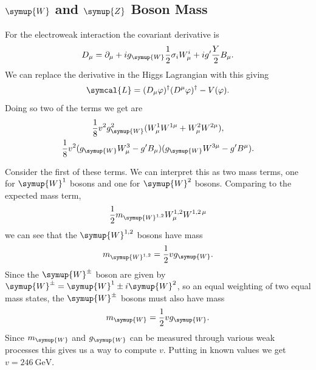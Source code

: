 \documentclass[fleqn]{NotesClass}
\newcommand{\Pparticle}[1]{\symup{#1}}
\newcommand{\PZ}{\ensuremath{\Pparticle{Z}}}
\newcommand{\PW}{\ensuremath{\Pparticle{W}}}
\newcommand{\PWpm}{\ensuremath{\Pparticle{W}^{\pm}}}
\newcommand{\hermit}{\dagger}
\newcommand{\lagrangianDensity}{\symcal{L}}
\begin{document}
    \subsection{\texorpdfstring{\PW}{W} and \texorpdfstring{\PZ}{Z} Boson Mass}
    For the electroweak interaction the covariant derivative is
    \begin{equation}
        D_\mu = \partial_\mu + ig_{\PW} \frac{1}{2}\sigma_i W_\mu^i + ig' \frac{Y}{2}B_\mu.
    \end{equation}
    We can replace the derivative in the Higgs Lagrangian with this giving
    \begin{equation}
        \lagrangianDensity = (D_\mu \varphi)^\hermit (D^\mu \varphi)^\hermit - V(\varphi).
    \end{equation}
    Doing so two of the terms we get are
    \begin{gather}
        \frac{1}{8} v^2 g_{\PW}^2 (W_\mu^1 W^{1\mu} + W_\mu^2 W^{2\mu}),\\
        \frac{1}{8}v^2(g_{\PW}W_\mu^3 - g'B_\mu)(g_{\PW} W^{3\mu} - g' B^\mu).
    \end{gather}
    
    Consider the first of these terms.
    We can interpret this as two mass terms, one for \(\PW^1\) bosons and one for \(\PW^2\) bosons.
    Comparing to the expected mass term,
    \begin{equation}
        \frac{1}{2} m_{\PW^{1,2}} W^{1,2}_\mu W^{1,2 \, \mu}
    \end{equation}
    we can see that the \(\PW^{1,2}\) bosons have mass
    \begin{equation}
        m_{\PW^{1,2}} = \frac{1}{2}vg_{\PW}.
    \end{equation}
    Since the \(\PWpm\) boson are given by \(\PWpm = \PW^{1} \pm i\PW^{2}\), so an equal weighting of two equal mass states, the \(\PWpm\) bosons must also have mass
    \begin{equation}
        m_{\PW} = \frac{1}{2}vg_{\PW}.
    \end{equation}
    Since \(m_{\PW}\) and \(g_{\PW}\) can be measured through various weak processes this gives us a way to compute \(v\).
    Putting in known values we get \(v = \qty{246}{\giga\electronvolt}\).
    
\end{document}
